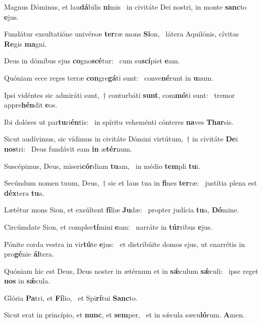 \item Magnus Dóminus, et lau\textbf{dá}bilis \textbf{ni}mis~\psstar{} in civitáte Dei nostri, in monte \textbf{sanc}to \textbf{e}jus.
\item Fundátur exsultatióne univérsæ \textbf{ter}ræ mons \textbf{Si}on,~\psstar{} látera Aquilónis, cívitas \textbf{Re}gis \textbf{ma}gni.
\item Deus in dómibus ejus \textbf{co}gno\textbf{scé}tur:~\psstar{} cum su\textbf{scí}piet \textbf{e}am.
\item Quóniam ecce reges terræ \textbf{con}gre\textbf{gá}ti sunt:~\psstar{} conve\textbf{né}runt in \textbf{u}num.
\item Ipsi vidéntes sic admiráti sunt,~† conturbáti \textbf{sunt}, com\textbf{mó}ti sunt:~\psstar{} tremor appre\textbf{hén}dit \textbf{e}os.
\item Ibi dolóres ut par\textbf{tu}ri\textbf{én}tis:~\psstar{} in spíritu veheménti cónteres \textbf{na}ves \textbf{Thar}sis.
\item Sicut audívimus, sic vídimus in civitáte Dómini virtútum,~† in civitáte \textbf{De}i \textbf{nos}tri:~\psstar{} Deus fundávit eam \textbf{in} æ\textbf{tér}num.
\item Suscépimus, Deus, miseri\textbf{cór}diam \textbf{tu}am,~\psstar{} in médio \textbf{tem}pli \textbf{tu}i.
\item Secúndum nomen tuum, Deus,~† sic et laus tua in \textbf{fi}nes \textbf{ter}ræ:~\psstar{} justítia plena est \textbf{déx}tera \textbf{tu}a.
\item Lætétur mons Sion, et exsúltent \textbf{fí}liæ \textbf{Ju}dæ:~\psstar{} propter judícia \textbf{tu}a, \textbf{Dó}mine.
\item Circúmdate Sion, et complec\textbf{tí}mini \textbf{e}am:~\psstar{} narráte in \textbf{túr}ribus \textbf{e}jus.
\item Pónite corda vestra in vir\textbf{tú}te \textbf{e}jus:~\psstar{} et distribúite domos ejus, ut enarrétis in pro\textbf{gé}nie \textbf{ál}tera.
\item Quóniam hic est Deus, Deus noster in ætérnum et in \textbf{sǽ}culum \textbf{sǽ}culi:~\psstar{} ipse reget \textbf{nos} in \textbf{sǽ}cula.
\item Glória \textbf{Pa}tri, et \textbf{Fí}lio,~\psstar{} et Spi\textbf{rí}tui \textbf{Sanc}to.
\item Sicut erat in princípio, et \textbf{nunc}, et \textbf{sem}per,~\psstar{} et in sǽcula sæcu\textbf{ló}rum. \textbf{A}men.
